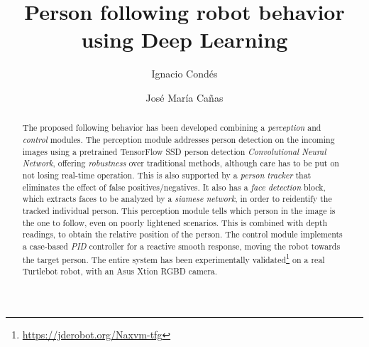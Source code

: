 \documentclass[11pt, a4paper]{svproc}
\title{Person following robot behavior using Deep Learning}
\author{Ignacio Condés\inst{1} \and José María Cañas\inst{2}}
\institute{Universidad Rey Juan Carlos,
	\email{ignacio.condes.m@gmail.com},
	\and
Universidad Rey Juan Carlos, \email{jmplaza@gsyc.es}}
\begin{document}
	\maketitle
	
	\begin{abstract}
		The proposed following behavior has been developed combining a \emph{perception} and \emph{control} modules. The perception module addresses person detection on the incoming images using a pretrained TensorFlow SSD person detection \emph{Convolutional Neural Network}, offering \emph{robustness} over traditional methods, although care has to be put on not losing real-time operation. This is also supported by a \emph{person tracker} that eliminates the effect of false positives/negatives. It also has a \emph{face detection} block, which extracts faces to be analyzed by a \emph{siamese network}, in order to reidentify the tracked individual person. This perception module tells which person in the image is the one to follow, even on poorly lightened scenarios. This is combined with depth readings, to obtain the relative position of the person. The control module implements a case-based \emph{PID} controller for a reactive smooth response, moving the robot towards the target person. The entire system has been experimentally validated\footnote{\url{https://jderobot.org/Naxvm-tfg}} on a real Turtlebot robot, with an Asus Xtion RGBD camera.
	\end{abstract}

	
	
\end{document}
